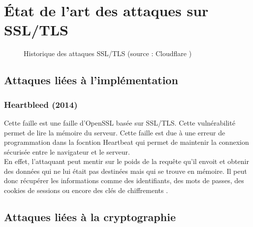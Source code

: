 \chapter{État de l'art des attaques sur SSL/TLS}

\begin{figure}[H]
  \caption{Historique des attaques SSL/TLS (source : Cloudflare \cite{cloudflare})}
\end{figure}

\section{Attaques liées à l'implémentation}

\subsection{Heartbleed (2014)}
Cette faille est une faille d'OpenSSL basée sur SSL/TLS. Cette vulnérabilité permet de lire la mémoire du serveur. Cette faille est due à une erreur de programmation dans la focntion Heartbeat qui permet de maintenir la connexion sécurisée entre le navigateur et le serveur. \\
En effet, l'attaquant peut mentir sur le poids de la requête qu'il envoit et obtenir des données qui ne lui était pas destinées mais qui se trouve en mémoire. Il peut donc récupérer les informations comme des identifiants, des mots de passes, des cookies de sessions ou encore des clés de chiffrements \cite{heartbleed}.

\section{Attaques liées à la cryptographie}

